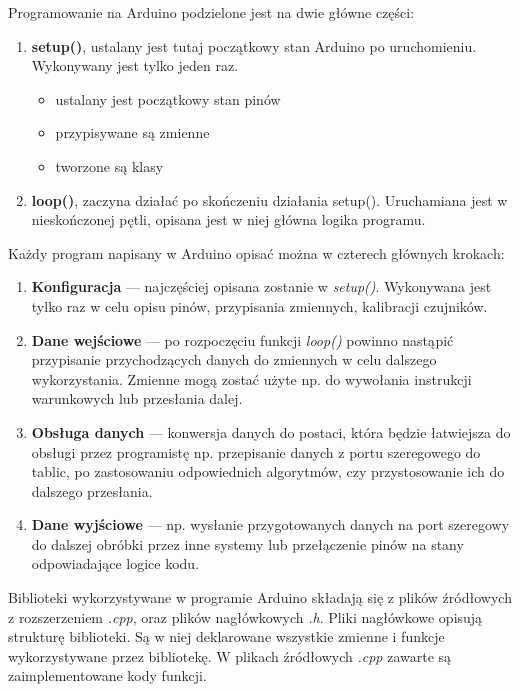\documentclass[a4paper,12pt, twoside]{article}
\begin{document}
    	\begin{flushleft}
    	Programowanie na Arduino podzielone jest na dwie główne części:
    	\begin{enumerate}
    	    \item  
    	    \textbf{setup()}, ustalany jest tutaj początkowy stan Arduino po uruchomieniu. Wykonywany jest tylko jeden raz.	
    	    \begin{itemize}
    	        \item ustalany jest początkowy stan pinów
    	        \item przypisywane są zmienne
    	        \item tworzone są klasy
        	\end{itemize}
        	\item  
    	    \textbf{loop()}, zaczyna działać po skończeniu działania setup(). Uruchamiana jest w nieskończonej pętli, opisana jest w niej główna logika programu.
    	\end{enumerate}
    	
    	Każdy program napisany w Arduino opisać można w czterech głównych krokach:\cite{stepsarduino} 
    	\begin{enumerate}
    	    \item \textbf{Konfiguracja} — najczęściej opisana zostanie w \textit{setup()}. Wykonywana jest tylko raz w celu opisu pinów, przypisania zmiennych, kalibracji czujników.
    	    \item \textbf{Dane wejściowe} — po rozpoczęciu funkcji \textit{loop()} powinno nastąpić przypisanie przychodzących danych do zmiennych w celu dalszego wykorzystania. Zmienne mogą zostać użyte np. do wywołania instrukcji warunkowych lub przesłania dalej.
    	    \item \textbf{Obsługa danych} — konwersja danych do postaci, która będzie łatwiejsza do obsługi przez programistę np. przepisanie danych z portu szeregowego do tablic, po zastosowaniu odpowiednich algorytmów, czy przystosowanie ich do dalszego przesłania.
    	    \item \textbf{Dane wyjściowe} — np. wysłanie przygotowanych danych na port szeregowy do dalszej obróbki przez inne systemy lub przełączenie pinów na stany odpowiadające logice kodu.
    	\end{enumerate}
    	\end{flushleft}
    	
        Biblioteki wykorzystywane w programie Arduino składają się z plików źródłowych z rozszerzeniem \textit{.cpp}, oraz plików nagłówkowych \textit{.h}. Pliki nagłówkowe opisują strukturę biblioteki. Są w niej deklarowane wszystkie zmienne i funkcje wykorzystywane przez bibliotekę. W plikach źródłowych \textit{.cpp} zawarte są zaimplementowane kody funkcji.
        
\end{document}
